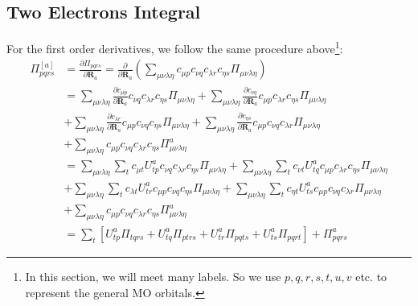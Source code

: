 \subsection{Two Electrons Integral}
%
%
For the first order derivatives, we follow the same procedure
above\footnote{In this section, we will meet many labels. So we use
$p,q,r,s,t,u,v$ etc. to represent the general MO orbitals.}:
\begin{align}
\label{two_electron_MO_INT_gradient_eq:1}
\Pi_{pqrs}^{[a]} &=\frac{\partial \Pi_{pqrs}}{\partial \bm{R}_{a}} =
\frac{\partial}{\partial \bm{R}_{a}}\left( \sum_{\mu\nu\lambda\eta}c_{\mu
p}c_{\nu q}c_{\lambda r}c_{\eta s}\Pi_{\mu\nu\lambda\eta}\right) \nonumber\\
&=  \sum_{\mu\nu\lambda\eta}
\frac{\partial c_{\mu p}}{\partial\bm{R}_{a}}
c_{\nu q}c_{\lambda r}c_{\eta s}
\Pi_{\mu\nu\lambda\eta} + 
       \sum_{\mu\nu\lambda\eta}
\frac{\partial c_{\nu q}}{\partial \bm{R}_{a}} 
c_{\mu p}c_{\lambda r}c_{\eta s}
\Pi_{\mu\nu\lambda\eta} \nonumber \\
&+  \sum_{\mu\nu\lambda\eta}
\frac{\partial c_{\lambda r}}{\partial\bm{R}_{a}}
c_{\mu p}c_{\nu q}c_{\eta s}
\Pi_{\mu\nu\lambda\eta} + 
       \sum_{\mu\nu\lambda\eta}
\frac{\partial c_{\eta s}}{\partial \bm{R}_{a}} 
c_{\mu p}c_{\nu q}c_{\lambda r}
\Pi_{\mu\nu\lambda\eta}   \nonumber \\
&+\sum_{\mu\nu\lambda\eta}
c_{\mu p}c_{\nu q}c_{\lambda r}c_{\eta s}
\Pi^{a}_{\mu\nu\lambda\eta}\nonumber \\
&= \sum_{\mu\nu\lambda\eta}
      \sum_{t}c_{\mu t}U^{a}_{tp}
c_{\nu q}c_{\lambda r}c_{\eta s}
\Pi_{\mu\nu\lambda\eta} + 
       \sum_{\mu\nu\lambda\eta}
       \sum_{t}c_{\nu t}U^{a}_{tq}
c_{\mu p}c_{\lambda r}c_{\eta s}
\Pi_{\mu\nu\lambda\eta} \nonumber \\
&+  \sum_{\mu\nu\lambda\eta}
      \sum_{t}c_{\lambda t}U^{a}_{tr}
c_{\mu p}c_{\nu q}c_{\eta s}
\Pi_{\mu\nu\lambda\eta} + 
       \sum_{\mu\nu\lambda\eta}
      \sum_{t}c_{\eta t}U^{a}_{ts} 
c_{\mu p}c_{\nu q}c_{\lambda r}
\Pi_{\mu\nu\lambda\eta} \nonumber \\
&+\sum_{\mu\nu\lambda\eta}
c_{\mu p}c_{\nu q}c_{\lambda r}c_{\eta s}
\Pi^{a}_{\mu\nu\lambda\eta}\nonumber \\
&= \sum_{t}\left[ 
U^{a}_{tp}\Pi_{tqrs} +
U^{a}_{tq}\Pi_{ptrs} + 
U^{a}_{tr}\Pi_{pqts} + 
U^{a}_{ts}\Pi_{pqrt}  
\right] + \Pi^{a}_{pqrs}
\end{align}


